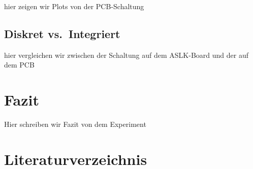 \documentclass[
  ngerman,
  letterpaper,
  DIV=11]{scrreprt}
\begin{document}
hier zeigen wir Plots von der PCB-Schaltung

\section{Diskret vs.~Integriert}\label{diskret-vs.-integriert}

hier vergleichen wir zwischen der Schaltung auf dem ASLK-Board und der
auf dem PCB

\chapter{Fazit}\label{fazit}

Hier schreiben wir Fazit von dem Experiment

\chapter*{Literaturverzeichnis}\label{literaturverzeichnis}

\label{refs}
\end{document}
